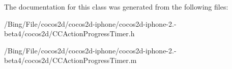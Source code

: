 The documentation for this class was generated from the following files\-:\begin{DoxyCompactItemize}
\item 
/\-Bing/\-File/cocos2d/cocos2d-\/iphone/cocos2d-\/iphone-\/2.-\/beta4/cocos2d/C\-C\-Action\-Progress\-Timer.\-h\item 
/\-Bing/\-File/cocos2d/cocos2d-\/iphone/cocos2d-\/iphone-\/2.-\/beta4/cocos2d/C\-C\-Action\-Progress\-Timer.\-m\end{DoxyCompactItemize}
